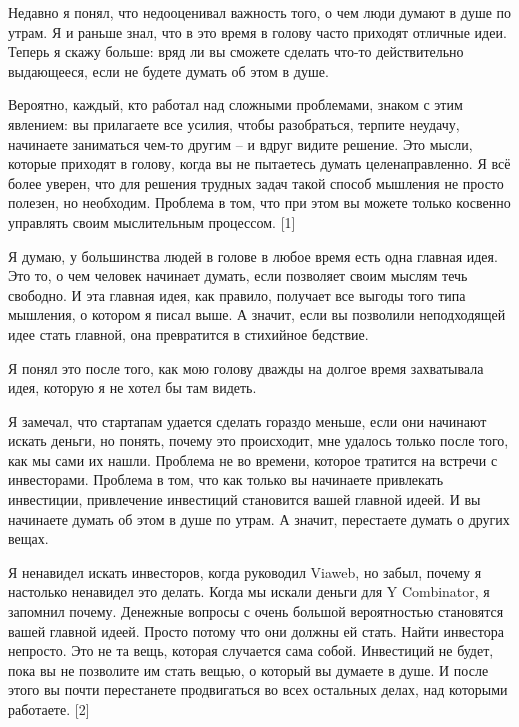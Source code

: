 \documentclass[ebook,12pt,oneside,openany]{memoir}
\date{}
\begin{document}
\maketitle

Недавно я понял, что недооценивал важность того, о чем люди думают в
душе по утрам. Я и раньше знал, что в это время в голову часто
приходят отличные идеи. Теперь я скажу больше: вряд ли вы сможете
сделать что-то действительно выдающееся, если не будете думать об этом
в душе.

Вероятно, каждый, кто работал над сложными проблемами, знаком с этим
явлением: вы прилагаете все усилия, чтобы разобраться, терпите
неудачу, начинаете заниматься чем-то другим – и вдруг видите решение.
Это мысли, которые приходят в голову, когда вы не пытаетесь думать
целенаправленно. Я всё более уверен, что для решения трудных задач
такой способ мышления не просто полезен, но необходим. Проблема в том,
что при этом вы можете только косвенно управлять своим мыслительным
процессом. [1]

Я думаю, у большинства людей в голове в любое время есть одна главная
идея. Это то, о чем человек начинает думать, если позволяет своим
мыслям течь свободно. И эта главная идея, как правило, получает все
выгоды того типа мышления, о котором я писал выше. А значит, если вы
позволили неподходящей идее стать главной, она превратится в стихийное
бедствие.

Я понял это после того, как мою голову дважды на долгое время
захватывала идея, которую я не хотел бы там видеть.

Я замечал, что стартапам удается сделать гораздо меньше, если они
начинают искать деньги, но понять, почему это происходит, мне удалось
только после того, как мы сами их нашли. Проблема не во времени,
которое тратится на встречи с инвесторами. Проблема в том, что как
только вы начинаете привлекать инвестиции, привлечение инвестиций
становится вашей главной идеей. И вы начинаете думать об этом в душе
по утрам. А значит, перестаете думать о других вещах.

Я ненавидел искать инвесторов, когда руководил Viaweb, но забыл,
почему я настолько ненавидел это делать. Когда мы искали деньги для Y
Combinator, я запомнил почему. Денежные вопросы с очень большой
вероятностью становятся вашей главной идеей. Просто потому что они
должны ей стать. Найти инвестора непросто. Это не та вещь, которая
случается сама собой. Инвестиций не будет, пока вы не позволите им
стать вещью, о который вы думаете в душе. И после этого вы почти
перестанете продвигаться во всех остальных делах, над которыми
работаете. [2]
\end{document}

